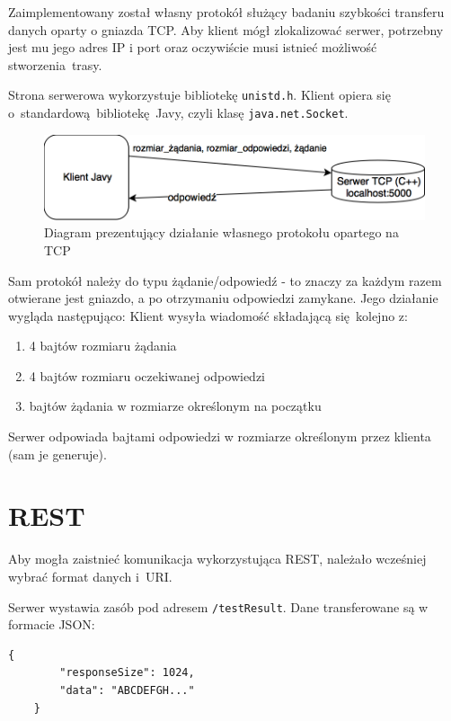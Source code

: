 Zaimplementowany został własny protokół służący badaniu szybkości transferu danych oparty o gniazda TCP. Aby klient mógł zlokalizować serwer, potrzebny jest mu jego adres IP i port oraz oczywiście musi istnieć możliwość stworzenia trasy.

Strona serwerowa wykorzystuje bibliotekę \texttt{unistd.h}. Klient opiera się o~standardową bibliotekę Javy, czyli klasę \texttt{java.net.Socket}.

\begin{figure}[h!]
    \centering
    \includegraphics[width=\textwidth,height=\textheight,keepaspectratio]{img/tcp_impl_diagram.png}
    \caption{Diagram prezentujący działanie własnego protokołu opartego na TCP}
\end{figure}

Sam protokół należy do typu żądanie/odpowiedź - to znaczy za każdym razem otwierane jest gniazdo, a po otrzymaniu odpowiedzi zamykane. Jego działanie wygląda następująco:
\newline
Klient wysyła wiadomość składającą się kolejno z:
\begin{enumerate}
    \item 4 bajtów rozmiaru żądania
    \item 4 bajtów rozmiaru oczekiwanej odpowiedzi
    \item bajtów żądania w rozmiarze określonym na początku
\end{enumerate}
Serwer odpowiada bajtami odpowiedzi w rozmiarze określonym przez klienta (sam je generuje).


\section{REST}

\label{REST_impl}
Aby mogła zaistnieć komunikacja wykorzystująca REST, należało wcześniej wybrać format danych i~URI.

Serwer wystawia zasób pod adresem \texttt{/testResult}. Dane transferowane są w formacie JSON:
\begin{lstlisting}[caption={Format danych wysyłany przez klienta},captionpos=b]
    {
        "responseSize": 1024,
        "data": "ABCDEFGH..."
    }
\end{lstlisting}

